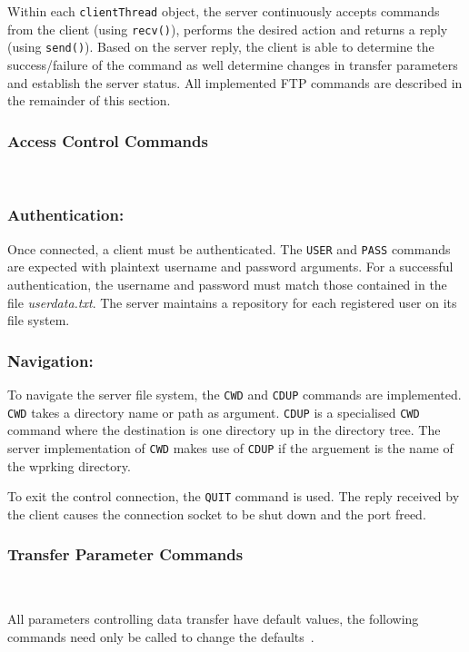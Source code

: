 \documentclass[10pt,twocolumn]{witseiepaper}
\begin{document}
 Within each \texttt{clientThread} object, the server continuously accepts commands from the client (using \texttt{recv()}), performs the desired action and returns a reply (using \texttt{send()}). Based on the server reply, the client is able to determine the success/failure of the command as well determine changes in transfer parameters and establish the server status. All implemented FTP commands are described in the remainder of this section.
 
\vspace*{-2mm}
\subsubsection{Access Control Commands} $   $

\subsubsection*{Authentication:} \vspace*{-\baselineskip}
Once connected, a client must be authenticated. The \texttt{USER} and \texttt{PASS} commands are expected with plaintext username and password arguments. For a successful authentication, the username and password must match those contained in the file \textit{userdata.txt}. The server maintains a repository for each registered user on its file system. 

\subsubsection*{Navigation:}
To navigate the server file system, the \texttt{CWD} and \texttt{CDUP} commands are implemented. \texttt{CWD} takes a directory name or path as argument. \texttt{CDUP} is a specialised \texttt{CWD} command where the destination is one directory up in the directory tree. The server implementation of \texttt{CWD} makes use of \texttt{CDUP} if the arguement is the name of the wprking directory.

To exit the control connection, the \texttt{QUIT} command is used. The reply received by the client causes the connection socket to be shut down and the port freed. 

\vspace*{-2mm}
\subsubsection{Transfer Parameter Commands} $   $

All parameters controlling data transfer have default values, the following commands need only be called to change the defaults~\cite{rfc959}. 
\end{document}
